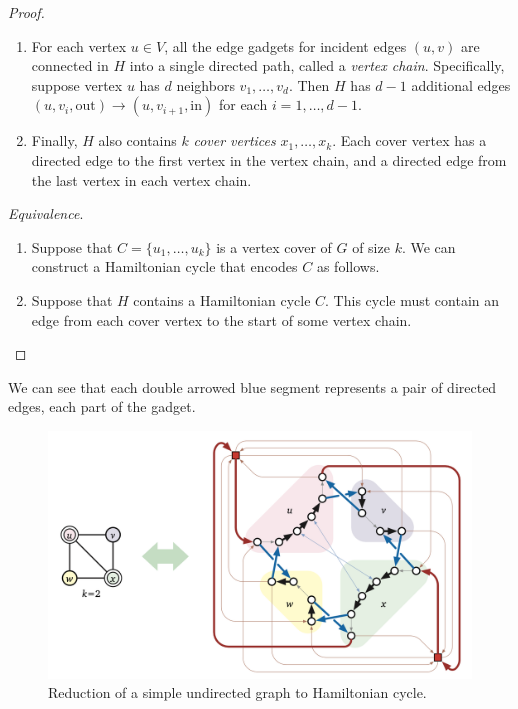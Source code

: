 \documentclass{article}
\begin{document}
\begin{proof}
\begin{enumerate}
          \item For each vertex $u \in V$, all the edge gadgets for incident edges $(u, v)$ are connected in $H$ into a single directed path, called a \textit{vertex chain}. Specifically, suppose vertex $u$ has $d$ neighbors $v_1, \ldots, v_d$. Then $H$ has $d-1$ additional edges $(u, v_i, \mathrm{out}) \rightarrow (u, v_{i+1}, \mathrm{in})$ for each $i = 1, \ldots, d-1$.  

          \item Finally, $H$ also contains $k$ \textit{cover vertices} $x_1, \ldots, x_k$. Each cover vertex has a directed edge to the first vertex in the vertex chain, and a directed edge from the last vertex in each vertex chain. 
        \end{enumerate}

        \textit{Equivalence}. 
        \begin{enumerate}
          \item Suppose that $C = \{u_1, \ldots, u_k\}$ is a vertex cover of $G$ of size $k$. We can construct a Hamiltonian cycle that encodes $C$ as follows. 
          \item Suppose that $H$ contains a Hamiltonian cycle $C$. This cycle must contain an edge from each cover vertex to the start of some vertex chain. 
        \end{enumerate}
      \end{proof}

      \begin{example}
        We can see that each double arrowed blue segment represents a pair of directed edges, each part of the gadget. 

        \begin{figure}[H]
          \centering 
          \includegraphics[scale=0.4]{img/ham_reduction.png}
          \caption{Reduction of a simple undirected graph to Hamiltonian cycle.} 
          \label{fig:ham_reduction}
        \end{figure}
      \end{example}
\end{document}
